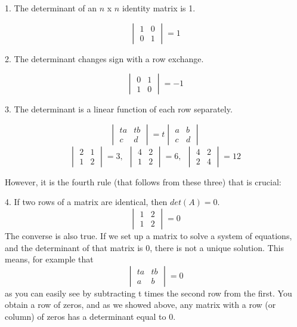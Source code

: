 \documentclass[11pt, oneside]{article}
\begin{document}
1.  The determinant of an $n$ x $n$ identity matrix is 1.
\vspace{2 mm}

\[
\begin{vmatrix} 
  1  &  0 \\ 
  0  &  1 
\end{vmatrix}
= 1
\]

2.  The determinant changes sign with a row exchange.
\vspace{2 mm}

\[
\begin{vmatrix} 
  0  &  1 \\ 
  1  &  0 
\end{vmatrix}
= -1
\]

3.  The determinant is a linear function of each row separately.
\vspace{2 mm}

\[
\begin{vmatrix} 
  ta  &  tb \\ 
  c  &  d 
\end{vmatrix}
= t
\begin{vmatrix} 
  a  &  b \\ 
  c  &  d 
\end{vmatrix}
\]
\[
\begin{vmatrix} 
  2  &  1 \\ 
  1  &  2 
\end{vmatrix}
= 3, \ \ 
\begin{vmatrix} 
  4  &  2 \\ 
  1  &  2 
\end{vmatrix}
= 6, \ \ 
\begin{vmatrix} 
  4  &  2 \\ 
  2  &  4 
\end{vmatrix}
= 12
\]

However, it is the fourth rule (that follows from these three) that is crucial:
\vspace{2 mm}

4.  If two rows of a matrix are identical, then $det(A) = 0$.
\vspace{2 mm}
\[
\begin{vmatrix} 
  1  &  2 \\ 
  1  &  2 
\end{vmatrix}
= 0
\]
The converse is also true.  If we set up a matrix to solve a system of equations, and the determinant of that matrix is 0, there is not a unique solution.  This means, for example that 
\[
\begin{vmatrix} 
  ta  &  tb \\ 
  a  &  b 
\end{vmatrix} = 0
\]
as you can easily see by subtracting t times the second row from the first.  You obtain a row of zeros, and as we showed above, any matrix with a row (or column) of zeros has a determinant equal to 0.
\end{document}
